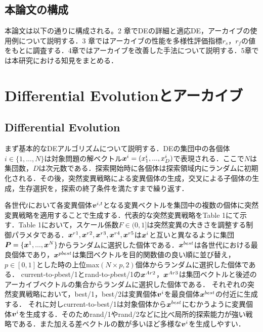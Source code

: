 \documentclass[a4paper,11pt,oneside,openany]{jsbook}
\def\vector#1{\mbox{\boldmath $#1$}}
\begin{document}
\section{本論文の構成}
本論文は以下の通りに構成される。2 章でDEの詳細と適応DE，アーカイブの使用例について説明する．3 章ではアーカイブの性能を多様性評価指標$r_s$，$r_f$の値をもとに調査する．4章ではアーカイブを改善した手法について説明する．5章では本研究における知見をまとめる．

\chapter{Differential Evolutionとアーカイブ}
\section{Differential Evolution}
まず基本的なDEアルゴリズムについて説明する．DEの集団中の各個体$i \in \{1, ..., N\}$は対象問題の解ベクトル$\vector{x}^i = (x^i_1, ..., x^i_D)$で表現される．ここで$N$は集団数，$D$は次元数である．探索開始時に各個体は探索領域内にランダムに初期化される．その後，突然変異戦略による変異個体の生成，交叉による子個体の生成，生存選択を，探索の終了条件を満たすまで繰り返す．

各世代$t$において各変異個体${\vector{v}^{i,t}}$となる変異ベクトルを集団中の複数の個体に突然変異戦略を適用することで生成する．代表的な突然変異戦略をTable 1にて示す．Table 1において，スケール係数${F\in(0,1]}$は突然変異の大きさを調整する制御パラメタである．$\vector{x}^{r1},\vector{x}^{r2},\vector{x}^{r3},\vector{x}^{r4},\vector{x}^{r5}$は${\vector{x}^i}$と互いと異なるように集団$\vector{P} = \{ \vector{x}^1, ..., \vector{x}^N \}$からランダムに選択した個体である．$\vector{x}^{best}$は各世代における最良個体であり，$\vector{x}^{pbest}$は集団ベクトルを目的関数値の良い順に並び替え，${p\in[0,1]}とした時の上位$max$(N \times p, 2)$個体からランダムに選択した個体である．
current-to-$p$best/1とrand-to-$p$best/1の${\vector{x}^{Ar2}}$，${\vector{x}^{Ar3}}$は集団ベクトルと後述のアーカイブベクトルの集合からランダムに選択した個体である．
それぞれの突然変異戦略において，best/1，best/2は変異個体{$\vector{v}^i$}を最良個体$\vector{x}^{best}$の付近に生成する．
それに対しcurrent-to-best/1は対象個体から$\vector{x}^{best}$にむかうように変異個体{$\vector{v}^i$}を生成する．そのためrand/1やrand/2などに比べ局所的探索能力が強い戦略である．また加える差ベクトルの数が多いほど多様な{$\vector{v}^i$}を生成しやすい．
\end{document}

